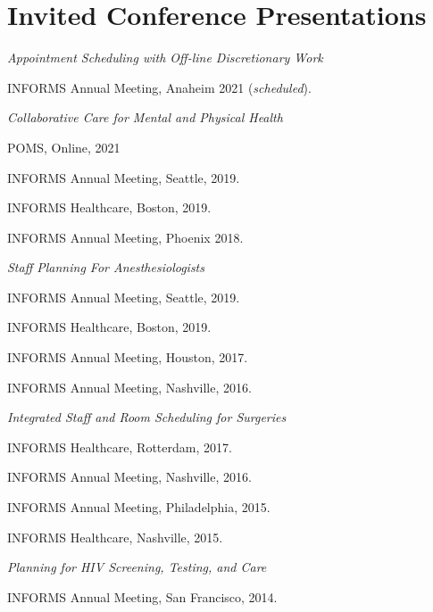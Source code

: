 \documentclass[11pt,a4paper]{article}
\renewenvironment{itemize}{
	\begin{list}{}{
			\setlength{\leftmargin}{1.5em}
		}
	}{
\end{list}
}
\begin{document}
	\section*{\textbf{Invited Conference Presentations}}
	\begin{itemize}
		\item \emph{Appointment Scheduling with Off-line Discretionary Work}
		\begin{itemize}
			\item INFORMS Annual Meeting, Anaheim 2021 (\emph{scheduled}).
		\end{itemize}
		\item \emph{Collaborative Care for Mental and Physical Health}
		\begin{itemize}
			\item POMS, Online, 2021
			\item INFORMS Annual Meeting, Seattle, 2019.
			\item INFORMS Healthcare, Boston, 2019.
			\item INFORMS Annual Meeting, Phoenix 2018.
		\end{itemize}
		\item \emph{Staff Planning For Anesthesiologists}
		\begin{itemize}
			\item INFORMS Annual Meeting, Seattle, 2019.
			\item INFORMS Healthcare, Boston, 2019.
			\item INFORMS Annual Meeting, Houston, 2017.
			\item  INFORMS Annual Meeting, Nashville, 2016.
		\end{itemize}
		\item \emph{Integrated Staff and Room Scheduling for Surgeries}
		\begin{itemize}
			\item INFORMS Healthcare, Rotterdam, 2017.
			\item INFORMS Annual Meeting, Nashville, 2016.
			\item INFORMS Annual Meeting, Philadelphia, 2015.
			\item INFORMS Healthcare, Nashville, 2015.
		\end{itemize}
		\item \emph{Planning for HIV Screening, Testing, and Care}
		\begin{itemize}
			\item INFORMS Annual Meeting, San Francisco, 2014.
		\end{itemize}
	\end{itemize}
\end{document}
